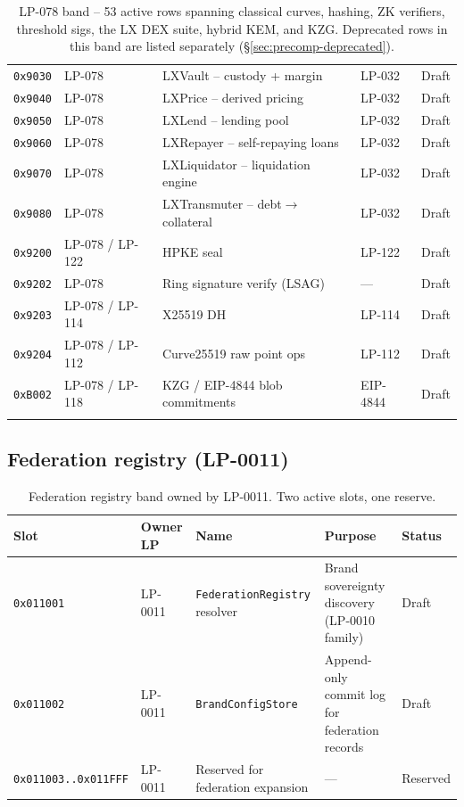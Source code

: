 \begin{longtable}{@{}p{2.0cm}p{2.4cm}p{4.2cm}p{3.0cm}p{1.2cm}@{}}
\texttt{0x9030} & LP-078 & LXVault -- custody + margin & LP-032 & Draft \\
\texttt{0x9040} & LP-078 & LXPrice -- derived pricing & LP-032 & Draft \\
\texttt{0x9050} & LP-078 & LXLend -- lending pool & LP-032 & Draft \\
\texttt{0x9060} & LP-078 & LXRepayer -- self-repaying loans & LP-032 & Draft \\
\texttt{0x9070} & LP-078 & LXLiquidator -- liquidation engine & LP-032 & Draft \\
\texttt{0x9080} & LP-078 & LXTransmuter -- debt$\to$collateral & LP-032 & Draft \\
\texttt{0x9200} & LP-078 / LP-122 & HPKE seal & LP-122 & Draft \\
\texttt{0x9202} & LP-078 & Ring signature verify (LSAG) & --- & Draft \\
\texttt{0x9203} & LP-078 / LP-114 & X25519 DH & LP-114 & Draft \\
\texttt{0x9204} & LP-078 / LP-112 & Curve25519 raw point ops & LP-112 & Draft \\
\texttt{0xB002} & LP-078 / LP-118 & KZG / EIP-4844 blob commitments & EIP-4844 & Draft \\
\bottomrule
\caption{LP-078 band -- 53 active rows spanning classical curves,
hashing, ZK verifiers, threshold sigs, the LX DEX suite, hybrid KEM,
and KZG. Deprecated rows in this band are listed separately
(\S\ref{sec:precomp-deprecated}).}
\label{tab:precomp-lp078}
\end{longtable}

\subsection{Federation registry (LP-0011)}

\begin{table}[h]
\centering
\small
\begin{tabular}{@{}p{3.4cm}p{1.4cm}p{3.4cm}p{4.0cm}p{1.0cm}@{}}
\toprule
\textbf{Slot} & \textbf{Owner LP} & \textbf{Name} & \textbf{Purpose} & \textbf{Status} \\
\midrule
\texttt{0x011001} & LP-0011 & \texttt{FederationRegistry} resolver & Brand sovereignty discovery (LP-0010 family) & Draft \\
\texttt{0x011002} & LP-0011 & \texttt{BrandConfigStore} & Append-only commit log for federation records & Draft \\
\texttt{0x011003..0x011FFF} & LP-0011 & Reserved for federation expansion & --- & Reserved \\
\bottomrule
\end{tabular}
\caption{Federation registry band owned by LP-0011. Two active slots,
one reserve.}
\label{tab:precomp-lp0011}
\end{table}

